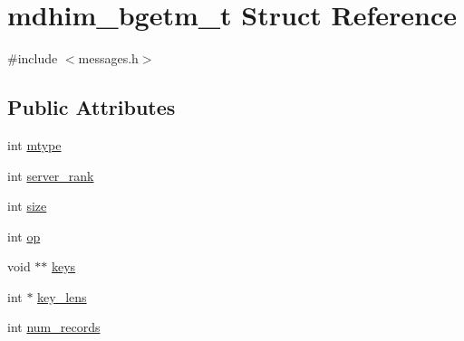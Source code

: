 \hypertarget{structmdhim__bgetm__t}{\section{mdhim\-\_\-bgetm\-\_\-t Struct Reference}
\label{d5/def/structmdhim__bgetm__t}
}


{\ttfamily \#include $<$messages.\-h$>$}

\subsection*{Public Attributes}
\begin{DoxyCompactItemize}
\item 
int \hyperlink{structmdhim__bgetm__t_aa52b25716fcf7fdc26af4dd48056d976}{mtype}
\item 
int \hyperlink{structmdhim__bgetm__t_a33b8bbb7a13cf0773954c22b18cac4f4}{server\-\_\-rank}
\item 
int \hyperlink{structmdhim__bgetm__t_aa2fc1aff991240e630c426100b3ee7c0}{size}
\item 
int \hyperlink{structmdhim__bgetm__t_aa4e54e836da625bad6ebc439c5f9e047}{op}
\item 
void $\ast$$\ast$ \hyperlink{structmdhim__bgetm__t_a6abc6929954a3e7aab4b71f12b9db668}{keys}
\item 
int $\ast$ \hyperlink{structmdhim__bgetm__t_a1bda084b30e5429093159a78827efb52}{key\-\_\-lens}
\item 
int \hyperlink{structmdhim__bgetm__t_af952f7de3351ee73515c1948c5faf927}{num\-\_\-records}
\end{DoxyCompactItemize}


